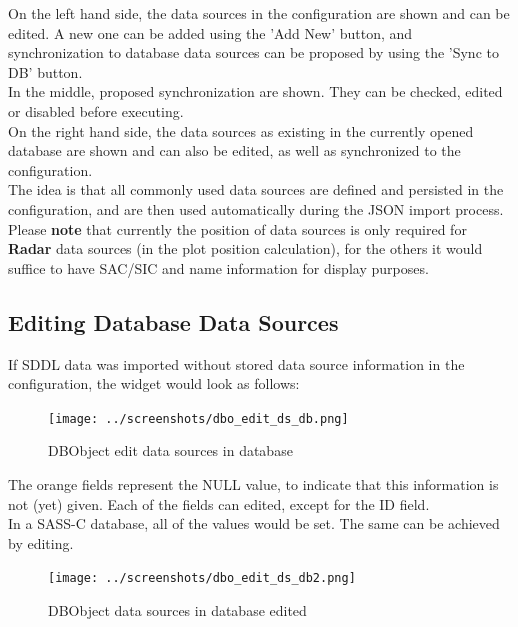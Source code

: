 On the left hand side, the data sources in the configuration are shown and can be edited. A new one can be added using the 'Add New' button, and synchronization to database data sources can be proposed by using the 'Sync to DB' button. \\

In the middle, proposed synchronization are shown. They can be checked, edited or disabled before executing. \\

On the right hand side, the data sources as existing in the currently opened database are shown and can also be edited, as well as synchronized to the configuration. \\

The idea is that all commonly used data sources are defined and persisted in the configuration, and are then used automatically during the JSON import process. \\

Please \textbf{note} that currently the position of data sources is only required for \textbf{Radar} data sources (in the plot position calculation), for the others it would suffice to have SAC/SIC and name information for display purposes.

\subsection{Editing Database Data Sources}

If SDDL data was imported without stored data source information in the configuration, the widget would look as follows:

\begin{figure}[H]
  \hspace*{-1cm}
    \texttt{[image: ../screenshots/dbo\_edit\_ds\_db.png]}
  \caption{DBObject edit data sources in database}
  \label{fig:dbo_edit_ds_db}
\end{figure}

The orange fields represent the NULL value, to indicate that this information is not (yet) given. Each of the fields can edited, except for the ID field. \\

In a SASS-C database, all of the values would be set. The same can be achieved by editing. \\

\begin{figure}[H]
  \hspace*{-2cm}
    \texttt{[image: ../screenshots/dbo\_edit\_ds\_db2.png]}
  \caption{DBObject data sources in database edited}
  \label{fig:dbo_edit_ds_db2}
\end{figure}

